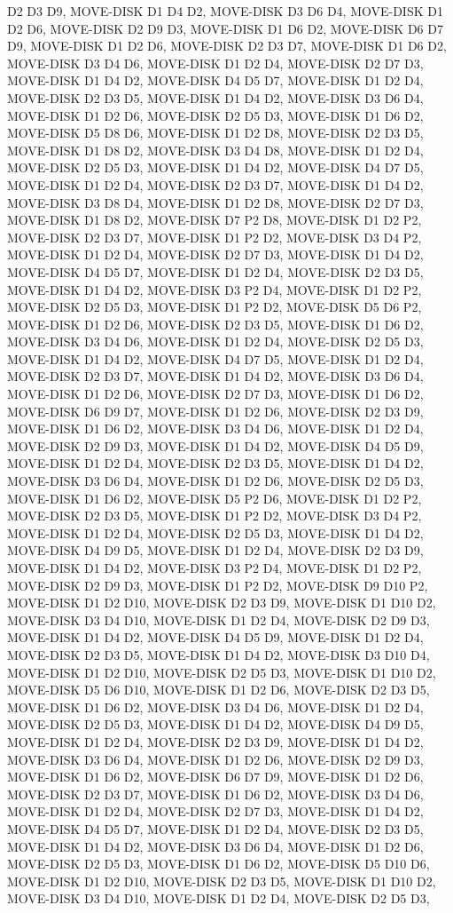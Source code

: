 \documentclass[12pt]{article}
\begin{document}
\begin{appendix}
\begin{itemize}
D2 D3 D9,  MOVE-DISK D1 D4 D2,  MOVE-DISK D3 D6 D4,  MOVE-DISK D1 D2 D6,  MOVE-DISK D2 D9 D3,  MOVE-DISK D1 D6 D2,  MOVE-DISK D6 D7 D9,  MOVE-DISK D1 D2 D6,  MOVE-DISK D2 D3 D7,  MOVE-DISK D1 D6 D2,  MOVE-DISK D3 D4 D6,  MOVE-DISK D1 D2 D4,  MOVE-DISK D2 D7 D3,  MOVE-DISK D1 D4 D2,  MOVE-DISK D4 D5 D7,  MOVE-DISK D1 D2 D4,  MOVE-DISK D2 D3 D5,  MOVE-DISK D1 D4 D2,  MOVE-DISK D3 D6 D4,  MOVE-DISK D1 D2 D6,  MOVE-DISK D2 D5 D3,  MOVE-DISK D1 D6 D2,  MOVE-DISK D5 D8 D6,  MOVE-DISK D1 D2 D8,  MOVE-DISK D2 D3 D5,  MOVE-DISK D1 D8 D2,  MOVE-DISK D3 D4 D8,  MOVE-DISK D1 D2 D4,  MOVE-DISK D2 D5 D3,  MOVE-DISK D1 D4 D2,  MOVE-DISK D4 D7 D5,  MOVE-DISK D1 D2 D4,  MOVE-DISK D2 D3 D7,  MOVE-DISK D1 D4 D2,  MOVE-DISK D3 D8 D4,  MOVE-DISK D1 D2 D8,  MOVE-DISK D2 D7 D3,  MOVE-DISK D1 D8 D2,  MOVE-DISK D7 P2 D8,  MOVE-DISK D1 D2 P2,  MOVE-DISK D2 D3 D7,  MOVE-DISK D1 P2 D2,  MOVE-DISK D3 D4 P2,  MOVE-DISK D1 D2 D4,  MOVE-DISK D2 D7 D3,  MOVE-DISK D1 D4 D2,  MOVE-DISK D4 D5 D7,  MOVE-DISK D1 D2 D4,  MOVE-DISK D2 D3 D5,  MOVE-DISK D1 D4 D2,  MOVE-DISK D3 P2 D4,  MOVE-DISK D1 D2 P2,  MOVE-DISK D2 D5 D3,  MOVE-DISK D1 P2 D2,  MOVE-DISK D5 D6 P2,  MOVE-DISK D1 D2 D6,  MOVE-DISK D2 D3 D5,  MOVE-DISK D1 D6 D2,  MOVE-DISK D3 D4 D6,  MOVE-DISK D1 D2 D4,  MOVE-DISK D2 D5 D3,  MOVE-DISK D1 D4 D2,  MOVE-DISK D4 D7 D5,  MOVE-DISK D1 D2 D4,  MOVE-DISK D2 D3 D7,  MOVE-DISK D1 D4 D2,  MOVE-DISK D3 D6 D4,  MOVE-DISK D1 D2 D6,  MOVE-DISK D2 D7 D3,  MOVE-DISK D1 D6 D2,  MOVE-DISK D6 D9 D7,  MOVE-DISK D1 D2 D6,  MOVE-DISK D2 D3 D9,  MOVE-DISK D1 D6 D2,  MOVE-DISK D3 D4 D6,  MOVE-DISK D1 D2 D4,  MOVE-DISK D2 D9 D3,  MOVE-DISK D1 D4 D2,  MOVE-DISK D4 D5 D9,  MOVE-DISK D1 D2 D4,  MOVE-DISK D2 D3 D5,  MOVE-DISK D1 D4 D2,  MOVE-DISK D3 D6 D4,  MOVE-DISK D1 D2 D6,  MOVE-DISK D2 D5 D3,  MOVE-DISK D1 D6 D2,  MOVE-DISK D5 P2 D6,  MOVE-DISK D1 D2 P2,  MOVE-DISK D2 D3 D5,  MOVE-DISK D1 P2 D2,  MOVE-DISK D3 D4 P2,  MOVE-DISK D1 D2 D4,  MOVE-DISK D2 D5 D3,  MOVE-DISK D1 D4 D2,  MOVE-DISK D4 D9 D5,  MOVE-DISK D1 D2 D4,  MOVE-DISK D2 D3 D9,  MOVE-DISK D1 D4 D2,  MOVE-DISK D3 P2 D4,  MOVE-DISK D1 D2 P2,  MOVE-DISK D2 D9 D3,  MOVE-DISK D1 P2 D2,  MOVE-DISK D9 D10 P2,  MOVE-DISK D1 D2 D10,  MOVE-DISK D2 D3 D9,  MOVE-DISK D1 D10 D2,  MOVE-DISK D3 D4 D10,  MOVE-DISK D1 D2 D4,  MOVE-DISK D2 D9 D3,  MOVE-DISK D1 D4 D2,  MOVE-DISK D4 D5 D9,  MOVE-DISK D1 D2 D4,  MOVE-DISK D2 D3 D5,  MOVE-DISK D1 D4 D2,  MOVE-DISK D3 D10 D4,  MOVE-DISK D1 D2 D10,  MOVE-DISK D2 D5 D3,  MOVE-DISK D1 D10 D2,  MOVE-DISK D5 D6 D10,  MOVE-DISK D1 D2 D6,  MOVE-DISK D2 D3 D5,  MOVE-DISK D1 D6 D2,  MOVE-DISK D3 D4 D6,  MOVE-DISK D1 D2 D4,  MOVE-DISK D2 D5 D3,  MOVE-DISK D1 D4 D2,  MOVE-DISK D4 D9 D5,  MOVE-DISK D1 D2 D4,  MOVE-DISK D2 D3 D9,  MOVE-DISK D1 D4 D2,  MOVE-DISK D3 D6 D4,  MOVE-DISK D1 D2 D6,  MOVE-DISK D2 D9 D3,  MOVE-DISK D1 D6 D2,  MOVE-DISK D6 D7 D9,  MOVE-DISK D1 D2 D6,  MOVE-DISK D2 D3 D7,  MOVE-DISK D1 D6 D2,  MOVE-DISK D3 D4 D6,  MOVE-DISK D1 D2 D4,  MOVE-DISK D2 D7 D3,  MOVE-DISK D1 D4 D2,  MOVE-DISK D4 D5 D7,  MOVE-DISK D1 D2 D4,  MOVE-DISK D2 D3 D5,  MOVE-DISK D1 D4 D2,  MOVE-DISK D3 D6 D4,  MOVE-DISK D1 D2 D6,  MOVE-DISK D2 D5 D3,  MOVE-DISK D1 D6 D2,  MOVE-DISK D5 D10 D6,  MOVE-DISK D1 D2 D10,  MOVE-DISK D2 D3 D5,  MOVE-DISK D1 D10 D2,  MOVE-DISK D3 D4 D10,  MOVE-DISK D1 D2 D4,  MOVE-DISK D2 D5 D3,  
\end{itemize}
\end{appendix}
\end{document}
